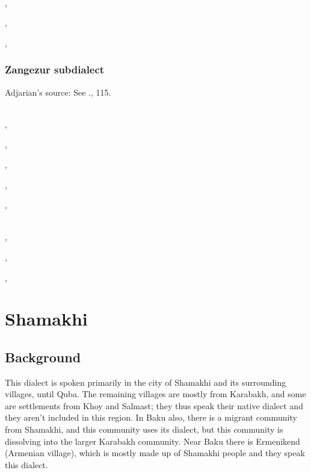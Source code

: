 ~\\

,

,

,


\subsection{Zangezur subdialect} 

Adjarian's source: See .,  115. 





~\\ 

,

,



,

,

,


~\\ 


,

,

,




\chapter{Shamakhi}\label{chapter:Shamakhi}


\begin{adjarianpage}\label{page:76}\end{adjarianpage}%

\section{Background}
This dialect is spoken primarily in the city of Shamakhi and its surrounding villages, until Quba. The remaining villages are mostly from Karabakh, and some are settlements from Khoy and Salmast; they thus speak their native dialect and they aren't included in this region. In Baku also, there is a migrant community from Shamakhi, and this community uses its dialect, but this community is dissolving into the larger Karabakh community. Near Baku there is Ermenikend (Armenian village), which is mostly made up of Shamakhi people and they speak this dialect. 

